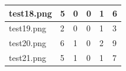 \documentclass[a4paper,12pt]{article}
\begin{document}
\begin{table}[H]
\begin{tabular}{llllll}
		\multicolumn{1}{|l|}{test18.png}                                                                       & \multicolumn{1}{l|}{5}                                                                 & \multicolumn{1}{l|}{0}                                                                  & \multicolumn{1}{l|}{0}                                                                  & \multicolumn{1}{l|}{1}                                                                                      & \multicolumn{1}{l|}{6}                                                                                             \\ \hline
		\multicolumn{1}{|l|}{test19.png}                                                                       & \multicolumn{1}{l|}{2}                                                                 & \multicolumn{1}{l|}{0}                                                                  & \multicolumn{1}{l|}{0}                                                                  & \multicolumn{1}{l|}{1}                                                                                      & \multicolumn{1}{l|}{3}                                                                                             \\ \hline
		\multicolumn{1}{|l|}{test20.png}                                                                       & \multicolumn{1}{l|}{6}                                                                 & \multicolumn{1}{l|}{1}                                                                  & \multicolumn{1}{l|}{0}                                                                  & \multicolumn{1}{l|}{2}                                                                                      & \multicolumn{1}{l|}{9}                                                                                             \\ \hline
		\multicolumn{1}{|l|}{test21.png}                                                                       & \multicolumn{1}{l|}{5}                                                                 & \multicolumn{1}{l|}{1}                                                                  & \multicolumn{1}{l|}{0}                                                                  & \multicolumn{1}{l|}{1}                                                                                      & \multicolumn{1}{l|}{7}                                                                                             \\ \hline

\end{tabular}
\end{table}
\end{document}

